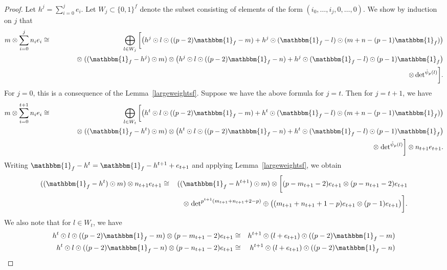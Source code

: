 \documentclass[10pt,a4paper]{amsart}
\begin{document}
\begin{proof}
Let $h^j = \sum_{i = 0}^j e_i$. Let $W_j \subset \{0,1\}^f$ denote the subset consisting of elements of the form $(i_0,\ldots,i_j,0,\ldots,0)$.  We show by induction on $j$ that
 \begin{eqnarray*}
    m \otimes \sum_{i = 0}^jn_ie_i & \cong & \bigoplus_{l \in W_j} \bigg[\big(h^j\odot l \odot ((p-2)\mathbbm{1}_f - m) + h^j\odot(\mathbbm{1}_f - l)\odot(m + n - (p-1)\mathbbm{1}_f)\big)\\&&\quad \qquad \otimes \; ((\mathbbm{1}_f - h^j)\odot m)
    \otimes \big(h^j\odot l \odot ((p-2)\mathbbm{1}_f - n) + h^j \odot(\mathbbm{1}_f - l)\odot(p-1)\mathbbm{1}_f \big)\\ &&\qquad \quad \otimes \,\mathrm{det}^{\hat\psi_p(l)}\bigg].
\end{eqnarray*}
For $j = 0$, this is a consequence of the Lemma~\ref{largeweightsf}. Suppose we have the above formula for $j = t$. Then for $j = t+1$, we have
\begin{eqnarray*}
    m \otimes \sum_{i = 0}^{t+1}n_ie_i & \cong &\bigoplus_{l \in W_t} \bigg[\big(h^t\odot l \odot ((p-2)\mathbbm{1}_f - m) + h^t\odot(\mathbbm{1}_f - l)\odot(m + n - (p-1)\mathbbm{1}_f)\big)\\&&\quad \qquad \otimes \; ((\mathbbm{1}_f - h^t)\odot m)\otimes \big(h^t\odot l \odot ((p-2)\mathbbm{1}_f - n) + h^t \odot(\mathbbm{1}_f - l)\odot(p-1)\mathbbm{1}_f \big) \\&&\quad \qquad \otimes \; \mathrm{det}^{\hat\psi_p(l)} \bigg] \otimes n_{t+1}e_{t+1}.\\
\end{eqnarray*}
Writing $\mathbbm{1}_f - h^t = \mathbbm{1}_f - h^{t+1} + e_{t+1}$ and applying Lemma~\ref{largeweightsf}, we obtain 
\begin{eqnarray*}((\mathbbm{1}_f - h^t)\odot m)\otimes n_{t+1}e_{t+1} &\cong &((\mathbbm{1}_{f} - h^{t+1})\odot m) \otimes \bigg [ (p - m_{t+1} - 2)e_{t+1} \otimes (p - n_{t+1} - 2)e_{t+1}\\ && \quad \otimes \; \mathrm{det}^{p^{t+1}(m_{t+1} + n_{t+1} + 2 - p)}\oplus \big((m_{t+1} + n_{t+1} + 1 - p)e_{t+1} \otimes (p-1)e_{t+1}\big) \bigg]. 
\end{eqnarray*}
We also note that for $l \in W_{t}$, we have
{\tiny
\begin{eqnarray*}
    h^{t}\odot l \odot((p-2)\mathbbm{1}_f - m) \otimes (p - m_{t+1} - 2)e_{t+1} &\cong& h^{t+1} \odot (l + e_{t+1})\odot((p-2)\mathbbm{1}_f - m)\\
    h^{t}\odot l \odot((p-2)\mathbbm{1}_f - n) \otimes (p - n_{t+1} - 2)e_{t+1} &\cong& h^{t+1} \odot (l + e_{t+1})\odot((p-2)\mathbbm{1}_f - n)\\

\end{eqnarray*}}
\end{proof}
\end{document}
